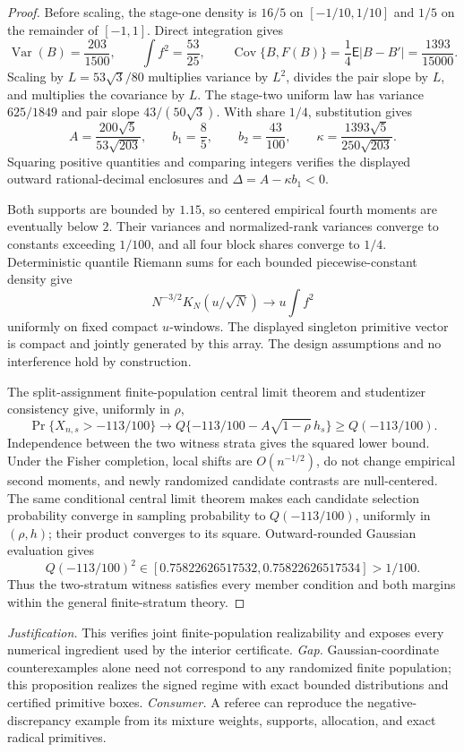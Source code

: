 \documentclass{article}
\begin{document}
\begin{proof}
Before scaling, the stage-one density is \(16/5\) on \([-1/10,1/10]\) and \(1/5\) on the remainder of \([-1,1]\).  Direct integration gives
\[
\operatorname{Var}(B)=\frac{203}{1500},\qquad
\int f^2=\frac{53}{25},\qquad
\operatorname{Cov}\{B,F(B)\}=\frac14\mathsf E|B-B'|=\frac{1393}{15000}.
\]
Scaling by \(L=53\sqrt3/80\) multiplies variance by \(L^2\), divides the pair slope by \(L\), and multiplies the covariance by \(L\).  The stage-two uniform law has variance \(625/1849\) and pair slope \(43/(50\sqrt3)\).  With share \(1/4\), substitution gives
\[
A=\frac{200\sqrt5}{53\sqrt{203}},\qquad
b_1=\frac85,\qquad b_2=\frac{43}{100},\qquad
\kappa=\frac{1393\sqrt5}{250\sqrt{203}}.
\]
Squaring positive quantities and comparing integers verifies the displayed outward rational-decimal enclosures and \(\Delta=A-\kappa b_1<0\).

Both supports are bounded by \(1.15\), so centered empirical fourth moments are eventually below \(2\).  Their variances and normalized-rank variances converge to constants exceeding \(1/100\), and all four block shares converge to \(1/4\).  Deterministic quantile Riemann sums for each bounded piecewise-constant density give
\[
N^{-3/2}K_N(u/\sqrt N)\longrightarrow u\int f^2
\]
uniformly on fixed compact \(u\)-windows.  The displayed singleton primitive vector is compact and jointly generated by this array.  The design assumptions and no interference hold by construction.

The split-assignment finite-population central limit theorem and studentizer consistency give, uniformly in \(\rho\),
\[
\Pr\{X_{n,s}>-113/100\}
\longrightarrow Q\{-113/100-A\sqrt{1-\rho}\,h_s\}
\ge Q(-113/100).
\]
Independence between the two witness strata gives the squared lower bound.  Under the Fisher completion, local shifts are \(O(n^{-1/2})\), do not change empirical second moments, and newly randomized candidate contrasts are null-centered.  The same conditional central limit theorem makes each candidate selection probability converge in sampling probability to \(Q(-113/100)\), uniformly in \((\rho,h)\); their product converges to its square.  Outward-rounded Gaussian evaluation gives
\[
Q(-113/100)^2\in[0.75822626517532,0.75822626517534]>1/100.
\]
Thus the two-stratum witness satisfies every member condition and both margins within the general finite-stratum theory.
\end{proof}
\par\smallskip\noindent \textit{Justification.} This verifies joint finite-population realizability and exposes every numerical ingredient used by the interior certificate. \textit{Gap.} Gaussian-coordinate counterexamples alone need not correspond to any randomized finite population; this proposition realizes the signed regime with exact bounded distributions and certified primitive boxes. \textit{Consumer.} A referee can reproduce the negative-discrepancy example from its mixture weights, supports, allocation, and exact radical primitives.
\end{document}
